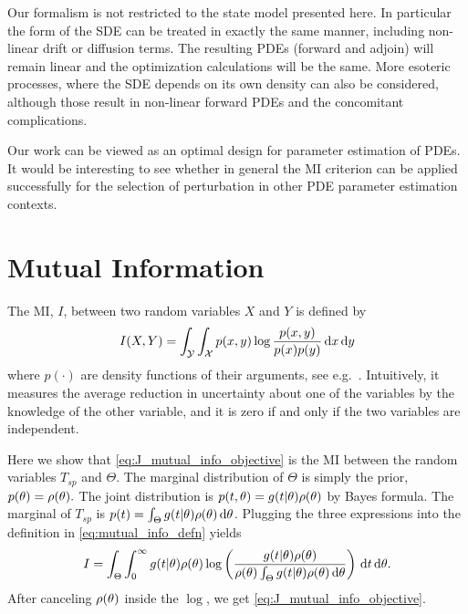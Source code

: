 \documentclass[12pt]{article}
\begin{document}
Our formalism is not restricted to the state model presented here. In particular
the form of the SDE can be treated in exactly the same manner, including
non-linear drift or diffusion terms. The resulting PDEs (forward and adjoin)
will remain linear and the optimization calculations will be the same. More
esoteric processes, where the SDE depends on its own density can also be
considered, although those result in non-linear forward PDEs and the concomitant
complications. 

Our work can be viewed as an optimal design for parameter estimation of PDEs. It
would be interesting to see whether in general the MI criterion can be applied
successfully for the selection of perturbation in other PDE parameter estimation
contexts.
 
\appendix
\section{Mutual Information}
\label{sec:mutual_info_defn} 
The MI, $I$, between two random variables $X$ and $Y$ is defined by
\begin{equation} 
I(X,Y) = \int_{\mathcal{Y}} \int_{\mathcal{X}} p(x,y) \log \frac{p(x,y)}{p(x)p(y)} \, \mathrm{d} x\, \mathrm{d} y
\label{eq:mutual_info_defn}
\end{equation}
where $p(\cdot)$ are density functions of their arguments, 
see e.g.\ \cite{MacKay2003,Cover2006}. Intuitively, it measures the
average reduction in uncertainty about one of the variables by the
knowledge of the other variable, and it is zero if and only if the two
variables are independent.

Here we show that \cref{eq:J_mutual_info_objective} is the MI between the random variables $T_{sp}$ and $\Theta$.  
The marginal distribution of $\Theta$ is simply the prior, $p({\theta}) =
\rho({\theta}).$ The joint distribution is $p(t,{\theta}) = 
g(t|{\theta})\rho({\theta})$ by Bayes formula. The marginal of $T_{sp}$ is $p(t) =
\int_\Theta g(t|{\theta})\rho({\theta}) \, \mathrm{d} {\theta}$. 
Plugging the three expressions into the definition in
\cref{eq:mutual_info_defn} yields
\begin{equation}
I = \int_\Theta \int_0^{\infty} g(t|{\theta})\rho({\theta}) 
\log \left( \frac{g(t|{\theta})\rho({\theta}) }{\rho({\theta})\int_\Theta g(t|{\theta})\rho({\theta}) \, \mathrm{d} {\theta}
 } \right)
\, \mathrm{d} t\, \mathrm{d} {\theta}.
\label{eq:mutual_info_prior_trajectory}
\end{equation}
After canceling $\rho({\theta})$ inside the $\log$, we get
\cref{eq:J_mutual_info_objective}.

    
%   

 
\end{document}
